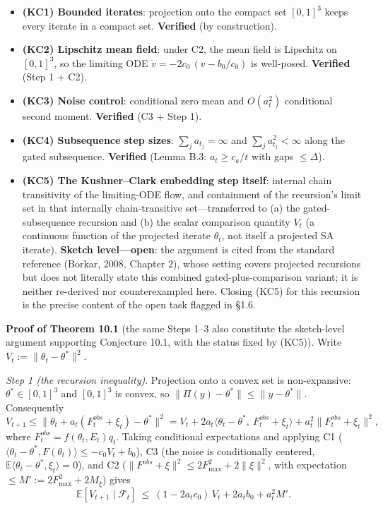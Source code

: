 \documentclass[
  11pt]{article}
\providecommand{\tightlist}{%
  \setlength{\itemsep}{0pt}\setlength{\parskip}{0pt}}
\begin{document}
\begin{itemize}
\tightlist
\item
  \textbf{(KC1) Bounded iterates}: projection onto the compact set
  \([0,1]^3\) keeps every iterate in a compact set. \textbf{Verified}
  (by construction).
\item
  \textbf{(KC2) Lipschitz mean field}: under C2, the mean field is
  Lipschitz on \([0,1]^3\), so the limiting ODE
  \(\dot v = -2c_0\,(v - b_0/c_0)\) is well-posed. \textbf{Verified}
  (Step 1 + C2).
\item
  \textbf{(KC3) Noise control}: conditional zero mean and \(O(a_t^2)\)
  conditional second moment. \textbf{Verified} (C3 + Step 1).
\item
  \textbf{(KC4) Subsequence step sizes}: \(\sum_j a_{t_j} = \infty\) and
  \(\sum_j a_{t_j}^2 < \infty\) along the gated subsequence.
  \textbf{Verified} (Lemma B.3: \(a_t \ge c_a/t\) with gaps
  \(\le \Delta\)).
\item
  \textbf{(KC5) The Kushner--Clark embedding step itself}: internal
  chain transitivity of the limiting-ODE flow, and containment of the
  recursion's limit set in that internally chain-transitive
  set---transferred to (a) the gated-subsequence recursion and (b) the
  scalar comparison quantity \(V_t\) (a continuous function of the
  projected iterate \(\theta_t\), not itself a projected SA iterate).
  \textbf{Sketch level---open}: the argument is cited from the standard
  reference (Borkar, 2008, Chapter 2), whose setting covers projected
  recursions but does not literally state this combined
  gated-plus-comparison variant; it is neither re-derived nor
  counterexampled here. Closing (KC5) for this recursion is the precise
  content of the open task flagged in §1.6.
\end{itemize}

\textbf{Proof of Theorem 10.1} (the same Steps 1--3 also constitute the
sketch-level argument supporting Conjecture 10.1, with the status fixed
by (KC5)). Write \(V_t := \|\theta_t - \theta^*\|^2\).

\emph{Step 1 (the recursion inequality)}. Projection onto a convex set
is non-expansive: \(\theta^* \in [0,1]^3\) and \([0,1]^3\) is convex, so
\(\|\Pi(y) - \theta^*\| \le \|y - \theta^*\|\). Consequently
\[V_{t+1} \le \|\theta_t + a_t(F_t^{obs} + \xi_t) - \theta^*\|^2 = V_t + 2a_t\langle \theta_t - \theta^*,\ F_t^{obs} + \xi_t\rangle + a_t^2\|F_t^{obs}+\xi_t\|^2,\]
where \(F_t^{obs} = f(\theta_t,E_t)q_t\). Taking conditional
expectations and applying C1
(\(\langle\theta_t-\theta^*, F(\theta_t)\rangle \le -c_0V_t + b_0\)), C3
(the noise is conditionally centered,
\(\mathbb{E}\langle \theta_t-\theta^*,\xi_t\rangle = 0\)), and C2
(\(\|F^{obs}+\xi\|^2 \le 2F_{\max}^2 + 2\|\xi\|^2\), with expectation
\(\le M' := 2F_{\max}^2 + 2M_\xi\)) gives
\[\mathbb{E}[V_{t+1} \mid \mathcal{F}_t] \ \le\ (1 - 2a_tc_0)\,V_t + 2a_tb_0 + a_t^2 M'.\]
\end{document}
